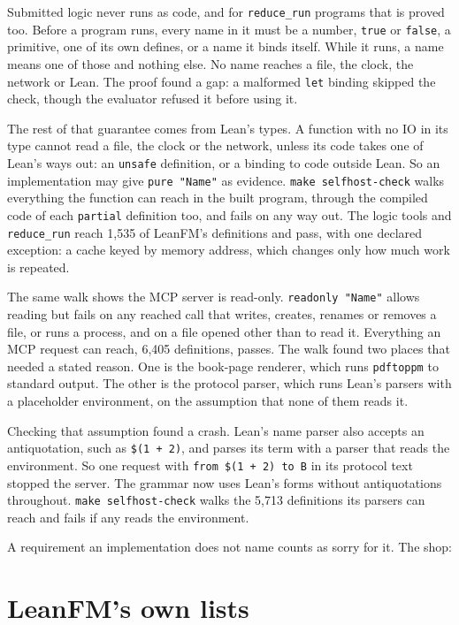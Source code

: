 Submitted logic never runs as code, and for \texttt{reduce\_run} programs that is proved too. Before
a program runs, every name in it must be a number, \texttt{true} or \texttt{false}, a primitive, one
of its own defines, or a name it binds itself. While it runs, a name means one of those and nothing
else. No name reaches a file, the clock, the network or Lean. The proof found a gap: a malformed
\texttt{let} binding skipped the check, though the evaluator refused it before using it.

The rest of that guarantee comes from Lean's types. A function with no IO in its type cannot read a
file, the clock or the network, unless its code takes one of Lean's ways out: an \texttt{unsafe}
definition, or a binding to code outside Lean. So an implementation may give
\texttt{pure "Name"} as evidence. \texttt{make selfhost-check} walks everything the function can
reach in the built program, through the compiled code of each \texttt{partial} definition too, and
fails on any way out. The logic tools and \texttt{reduce\_run} reach 1{,}535 of LeanFM's definitions
and pass, with one declared exception: a cache keyed by memory address, which changes only how much
work is repeated.

The same walk shows the MCP server is read-only. \texttt{readonly "Name"} allows reading but fails
on any reached call that writes, creates, renames or removes a file, or runs a process, and on a file
opened other than to read it. Everything an MCP request can reach, 6{,}405 definitions, passes. The
walk found two places that needed a stated reason. One is the book-page renderer, which runs
\texttt{pdftoppm} to standard output. The other is the protocol parser, which runs Lean's parsers with
a placeholder environment, on the assumption that none of them reads it.

Checking that assumption found a crash. Lean's name parser also accepts an antiquotation, such as
\texttt{\$(1 + 2)}, and parses its term with a parser that reads the environment. So one request with
\texttt{from \$(1 + 2) to B} in its protocol text stopped the server. The grammar now uses Lean's forms
without antiquotations throughout. \texttt{make selfhost-check} walks the 5{,}713 definitions its
parsers can reach and fails if any reads the environment.

A requirement an implementation does not name counts as sorry for it. The shop:


\section{LeanFM's own lists}

